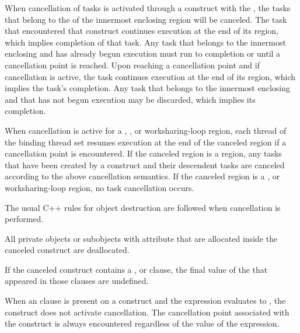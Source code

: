 When cancellation of tasks is activated through a  construct with
the  , the tasks that belong to the
 of the innermost enclosing  region
will be canceled. The task that encountered that construct continues execution
at the end of its  region, which implies completion of that
task. Any task that belongs to the innermost enclosing
 and has already begun execution must run to
completion or until a cancellation point is reached. Upon reaching a
cancellation point and if cancellation is active, the task continues
execution at the end of its  region, which implies the
task's completion. Any task that belongs to the innermost enclosing
 and that has not begun execution may be discarded,
which implies its completion.

When cancellation is active for a , , or
worksharing-loop region, each thread of the binding thread set resumes 
execution at the end of the canceled region if a cancellation point is 
encountered. If the canceled region is a  region, any
tasks that have been created by a  construct and their descendent 
tasks are canceled according to the above  cancellation 
semantics. If the canceled region is a , or worksharing-loop 
region, no task cancellation occurs.

\begin{cppspecific}
The usual C++ rules for object destruction are followed when cancellation is performed.
\end{cppspecific}

\begin{fortranspecific}
All private objects or subobjects with  attribute that 
are allocated inside the canceled construct are deallocated.
\end{fortranspecific}

If the canceled construct contains a ,  
or  clause, the final value of the  that 
appeared in those clauses are undefined.

When an  clause is present on a  construct and the 
 expression evaluates to , the  construct 
does not activate cancellation. The cancellation point associated with the 
 construct is always encountered regardless of the value of
the  expression.

